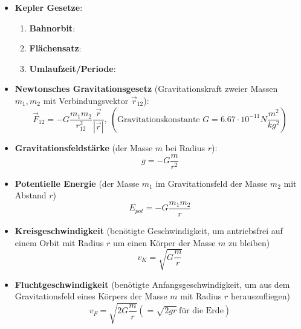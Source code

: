 \begin{itemize}
	\item \textbf{Kepler Gesetze}:
	\begin{enumerate}
		\item \textbf{Bahnorbit}: 
		\item \textbf{Flächensatz}: 
		\item \textbf{Umlaufzeit/Periode}: 
	\end{enumerate}
	\item \textbf{Newtonsches Gravitationsgesetz} (Gravitationskraft zweier Massen $m_1, m_2$ mit Verbindungsvektor $\vec{r}_{12}$):
	\begin{equation}
		\vec{F}_{12} = -G\frac{m_1m_2}{r_{12}^2} \frac{\vec{r}}{|\vec{r}|},\ (\text{Gravitationskonstante } G = 6.67 \cdot 10^{-11}N\frac{m^2}{kg^2})
	\end{equation}
	\item \textbf{Gravitationsfeldstärke} (der Masse $m$ bei Radius $r$):
	\begin{equation}
		g = -G\frac{m}{r^2}
	\end{equation}
	\item \textbf{Potentielle Energie} (der Masse $m_1$ im Gravitationsfeld der Masse $m_2$ mit Abstand $r$)
	\begin{equation}
		E_{pot} = -G\frac{m_1m_2}{r}
	\end{equation}
	\item \textbf{Kreisgeschwindigkeit} (benötigte Geschwindigkeit, um antriebsfrei auf einem Orbit mit Radius $r$ um einen Körper der Masse $m$ zu bleiben)
	\begin{equation}
		v_K = \sqrt{G\frac{m}{r}}
	\end{equation}
	\item \textbf{Fluchtgeschwindigkeit} (benötigte Anfangsgeschwindigkeit, um aus dem Gravitationsfeld eines Körpers der Masse $m$ mit Radius $r$ herauszufliegen)
	\begin{equation}
		v_F = \sqrt{2G\frac{m}{r}} (= \sqrt{2gr}\ \text{für die Erde})
	\end{equation}
\end{itemize}

